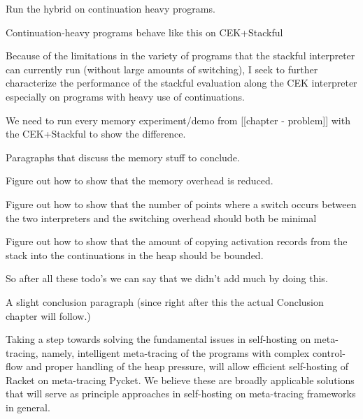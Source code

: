      \begin{show-experiment}
        Run the hybrid on continuation heavy programs.
      \end{show-experiment}

      \begin{paragraph-here}
        Continuation-heavy programs behave like this on CEK+Stackful
      \end{paragraph-here}

      Because of the limitations in the variety of programs that the
      stackful interpreter can currently run (without large amounts of
      switching), I seek to further characterize the performance of the
      stackful evaluation along the CEK interpreter especially on programs
      with heavy use of continuations.

      \begin{show-experiment}
        We need to run every memory experiment/demo from [[chapter - problem]] with the CEK+Stackful to show the difference.
      \end{show-experiment}

      \begin{paragraph-here}
        Paragraphs that discuss the memory stuff to conclude.
      \end{paragraph-here}

      \begin{todo}
        Figure out how to show that the memory overhead is reduced.
      \end{todo}

      \begin{todo}
        Figure out how to show that the number of points where a switch occurs between the two interpreters and the switching overhead should both be minimal
      \end{todo}

      \begin{todo}
        Figure out how to show that the amount of copying activation records from the stack into the continuations in the heap should be bounded.
      \end{todo}

      \begin{paragraph-here}
        So after all these todo's we can say that we didn't add much by doing this.
      \end{paragraph-here}

      \begin{paragraph-here}
        A slight conclusion paragraph (since right after this the actual Conclusion chapter will follow.)
      \end{paragraph-here}

      Taking a step towards solving the fundamental issues in self-hosting
      on meta-tracing, namely, intelligent meta-tracing of the programs with
      complex control-flow and proper handling of the heap pressure, will
      allow efficient self-hosting of Racket on meta-tracing Pycket. We
      believe these are broadly applicable solutions that will serve as
      principle approaches in self-hosting on meta-tracing frameworks in
      general.
